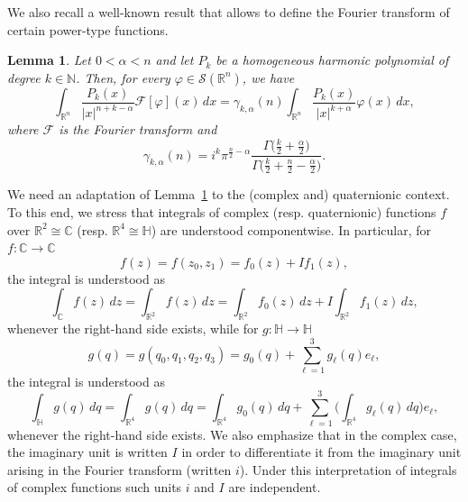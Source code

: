 \documentclass[reqno,11pt]{amsart}
\newtheorem{lemma}[theorem]{Lemma}
\theoremstyle{definition}
\def\R{\mathbb{R}}
\begin{document}
We also recall a well-known result that allows to define the Fourier transform of certain power-type functions.

\begin{lemma}\cite[p. 73]{Stein}\label{LEMstein}
	Let $0 < \alpha <n$ and let $P_k$ be a homogeneous harmonic polynomial of degree $k\in \mathbb{N}$. Then, for every $\varphi \in \mathcal{S}(\R^n)$, we have
	\begin{equation*}
		\int_{\R^n} \frac{P_k(x)}{|x|^{n+k-\alpha}} \mathcal{F}[\varphi ](x) \, dx= \gamma_{k,\alpha}(n) \int_{\R^n} \frac{P_k(x)}{|x|^{k+\alpha}} \varphi(x)\,  dx,
	\end{equation*}
	where $\mathcal{F}$ is the Fourier transform and
	\begin{equation}
		\label{gammaRn}
		\gamma_{k, \alpha}(n)=i^k \pi^{\frac{n}{2}-\alpha} \frac{\Gamma \big(  \frac{k}{2}+ \frac{\alpha}{2}\big)}{\Gamma \big(\frac{k}{2}+\frac{n}{2}-\frac{\alpha}{2} \big)}.
	\end{equation}
\end{lemma}

We need an adaptation of Lemma~\ref{LEMstein} to the (complex and) quaternionic context. To this end, we stress that integrals of complex (resp. quaternionic) functions $f$ over $\R^2\cong\mathbb{C}$ (resp. $\R^4\cong \mathbb{H}$) are understood componentwise. In particular, for $f:\mathbb{C}\to \mathbb{C}$
\[
f(z)=f(z_0,z_1) = f_0(z) + If_1(z),
\]
the integral is understood as
\begin{equation}
	\label{EQcomplex}
	\int_{\mathbb{C}} f(z)\, dz  = \int_{\R^2} f(z)\, dz = \int_{\R^2} f_0(z)\, dz  + I\int_{\R^2} f_1(z)\, dz,
\end{equation}
whenever the right-hand side exists, while for $g:\mathbb{H}\to \mathbb{H}$
\[
g(q)=g(q_0,q_1,q_2,q_3) = g_0(q) + \sum_{\ell=1}^3 g_\ell(q) e_\ell,
\]
the integral is understood as
\begin{equation}
	\label{EQquaternioniccomponent}
	\int_{\mathbb{H}} g(q)\, dq  = \int_{\R^4} g(q)\, dq = \int_{\R^4} g_0(q)\, dq  + \sum_{\ell=1}^3 \bigg( \int_{\R^4} g_\ell(q) \, dq \bigg) e_\ell,
\end{equation}
whenever the right-hand side exists. We also emphasize that in the complex case, the imaginary unit is written $I$ in order to differentiate it from the imaginary unit arising in the Fourier transform (written $i$). Under this interpretation of integrals of complex functions such units $i$ and $I$ are independent.
\end{document}
